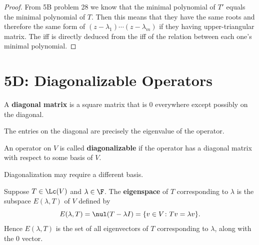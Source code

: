 \documentclass{extarticle}
\begin{document}
\begin{proof}
From 5B problem 28 we know that the minimal polynomial of \(T'\) equals the minimal polynomial of \(T\). 
Then this means that they have the same roots and therefore the same form of \((z - \lambda_1) 
\cdots (z - \lambda_m)\) if they having upper-triangular matrix. The iff is directly deduced from the iff 
of the relation between each one's minimal polynomial.
\end{proof}


\newpage 
\section*{5D: Diagonalizable Operators}

\begin{definition}
    A \textbf{diagonal matrix} is a square matrix that is 0 everywhere except possibly on the 
    diagonal.    
\end{definition}

\begin{remark}
    The entries on the diagonal are precisely the eigenvalue of the operator.
\end{remark}

\begin{definition}[diagonalizable]
    An operator on \(V\) is called \textbf{diagonalizable} if the operator has a diagonal matrix 
    with respect to some basis of \(V\).
\end{definition}

\begin{remark}
    Diagonalization may require a different basis.
\end{remark}

\begin{definition}
    Suppose \(T \in \Lc(V)\) and \(\lambda \in \F\). The \textbf{eigenspace} of \(T\) corresponding to 
    \(\lambda\) is the subspace \(E (\lambda, T)\) of \(V\) defined by 
    \[E(\lambda, T) = \nul (T - \lambda I) = \{v \in V \colon Tv = \lambda v\}.\]
    Hence \(E(\lambda, T)\) is the set of all eigenvectors of \(T\) corresponding to \(\lambda\), along 
    with the 0 vector. 
\end{definition}
\end{document}
